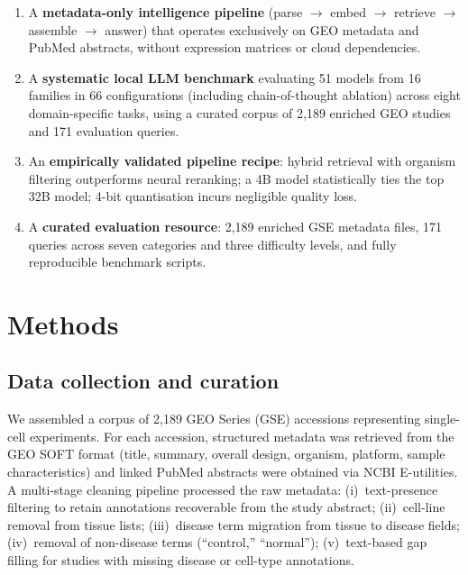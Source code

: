 \documentclass[sn-nature]{sn-jnl}
\begin{document}
\begin{enumerate}[leftmargin=2em, itemsep=2pt]
  \item A \textbf{metadata-only intelligence pipeline} (parse $\to$ embed
    $\to$ retrieve $\to$ assemble $\to$ answer) that operates exclusively
    on GEO metadata and PubMed abstracts, without expression matrices or
    cloud dependencies.

  \item A \textbf{systematic local LLM benchmark} evaluating 51 models from
    16 families in 66 configurations (including chain-of-thought ablation)
    across eight domain-specific tasks, using a curated corpus of 2{,}189
    enriched GEO studies and 171 evaluation queries.

  \item An \textbf{empirically validated pipeline recipe}: hybrid retrieval
    with organism filtering outperforms neural reranking; a 4B model
    statistically ties the top 32B model; 4-bit quantisation incurs
    negligible quality loss.

  \item A \textbf{curated evaluation resource}: 2{,}189 enriched GSE
    metadata files, 171 queries across seven categories and three difficulty
    levels, and fully reproducible benchmark scripts.
\end{enumerate}

\section{Methods}\label{sec:methods}

\subsection{Data collection and curation}\label{sec:data}

We assembled a corpus of 2{,}189 GEO Series (GSE) accessions representing
single-cell experiments. For each accession, structured metadata was
retrieved from the GEO SOFT format (title, summary, overall design,
organism, platform, sample characteristics) and linked PubMed abstracts were
obtained via NCBI E-utilities. A multi-stage cleaning pipeline processed the
raw metadata: (i)~text-presence filtering to retain annotations recoverable
from the study abstract; (ii)~cell-line removal from tissue lists;
(iii)~disease term migration from tissue to disease fields; (iv)~removal of
non-disease terms (``control,'' ``normal''); (v)~text-based gap filling for
studies with missing disease or cell-type annotations.
\end{document}

